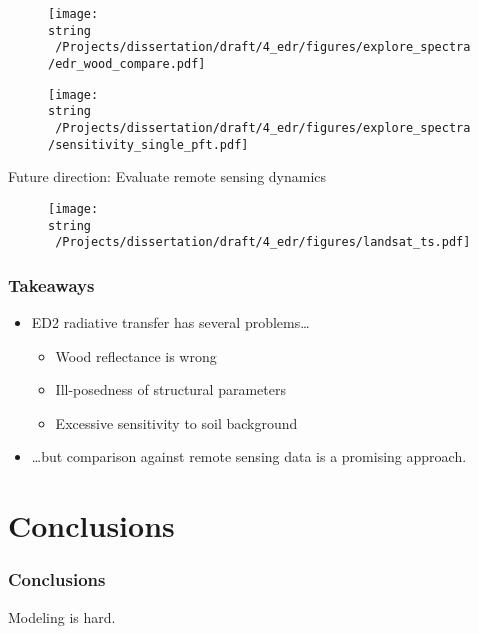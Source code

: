 \documentclass{beamer}
\begin{document}

\begin{frame}
  \begin{figure}
    \centering
    \texttt{[image: \\string ~/Projects/dissertation/draft/4\_edr/figures/explore\_spectra/edr\_wood\_compare.pdf]}
  \end{figure}
\end{frame}

\begin{frame}
  \begin{figure}
    \centering
    \texttt{[image: \\string ~/Projects/dissertation/draft/4\_edr/figures/explore\_spectra/sensitivity\_single\_pft.pdf]}
  \end{figure}
\end{frame}

\begin{frame}{Future direction: Evaluate remote sensing dynamics}
  \begin{figure}
    \centering
    \texttt{[image: \\string ~/Projects/dissertation/draft/4\_edr/figures/landsat\_ts.pdf]}
  \end{figure}
\end{frame}

\begin{frame} \frametitle{Takeaways}
  \begin{itemize}
  \item ED2 radiative transfer has several problems\ldots
    \begin{itemize}
    \item Wood reflectance is wrong
    \item Ill-posedness of structural parameters
    \item Excessive sensitivity to soil background
    \end{itemize}
  \item \ldots but comparison against remote sensing data is a promising approach.
  \end{itemize}
\end{frame}

\section{Conclusions}

\begin{frame} \frametitle{Conclusions}
  Modeling is hard.
\end{frame}
\end{document}
